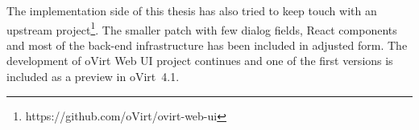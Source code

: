 The implementation side of this thesis has also tried to keep touch with an upstream project\footnote{https://github.com/oVirt/ovirt-web-ui}. The smaller patch with few dialog fields, React components and most of the back-end infrastructure has been included in adjusted form. The development of oVirt Web UI project continues and one of the first versions is included as a preview in oVirt~4.1.


 
